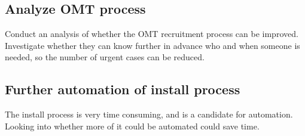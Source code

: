 \subsection{Analyze OMT process}
Conduct an analysis of whether the OMT recruitment process can be improved.
Investigate whether they can know further in advance who and when someone is needed, so the number of urgent cases can be reduced.

\subsection{Further automation of install process}
The install process is very time consuming, and is a candidate for automation.
Looking into whether more of it could be automated could save time.